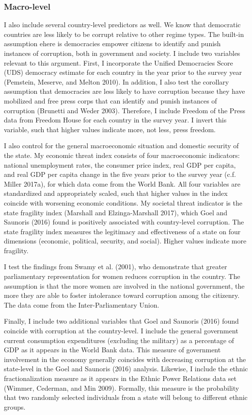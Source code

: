 \documentclass[11pt,]{article}
\begin{document}
\subsubsection{Macro-level}\label{macro-level}

I also include several country-level predictors as well. We know that
democratic countries are less likely to be corrupt relative to other
regime types. The built-in assumption ehere is democracies empower
citizens to identify and punish instances of corruption, both in
government and society. I include two variables relevant to this
argument. First, I incorporate the Unified Democracies Score (UDS)
democracy estimate for each country in the year prior to the survey year
(Pemstein, Meserve, and Melton 2010). In addition, I also test the
corollary assumption that democracies are less likely to have corruption
because they have mobilized and free press corps that can identify and
punish instances of corruption (Brunetti and Weder 2003). Therefore, I
include Freedom of the Press data from Freedom House for each country in
the survey year. I invert this variable, such that higher values
indicate more, not less, press freedom.

I also control for the general macroeconomic situation and domestic
security of the state. My economic threat index consists of four
macroeconomic indicators: national unemployment rates, the consumer
price index, real GDP per capita, and real GDP per capita change in the
five years prior to the survey year (c.f. Miller 2017a), for which data
come from the World Bank. All four variables are standardized and
appropriately scaled, such that higher values in the index coincide with
worsening economic conditions. My societal threat indicator is the state
fragility index (Marshall and Elzinga-Marshall 2017), which Goel and
Saunoris (2016) found is positively associated with country-level
corruption. The state fragility index measures the legitimacy and
effectiveness of a state on four dimensions (economic, political,
security, and social). Higher values indicate more fragility.

I test the findings from Swamy et al. (2001), who demonstrate that
greater parliamentary representation for women reduces corruption in the
country. The assumption is that the more women are involved in the
national government, the more they are able to foster intolerance toward
corruption among the citizenry. The data come from the
Inter-Parliamentary Union.

Finally, I include two additional variables that Goel and Saunoris
(2016) found coincide with corruption at the country-level. I include
the general government current consumption expenditures (excluding the
military) as a percentage of GDP as it appears in the World Bank data.
This measure of government involvement in the economy generally
coincides with decreasing corruption at the state-level in the Goel and
Saunoris (2016) analysis. Likewise, I include the ethnic
fractionalization measure as it appears in the Ethnic Power Relations
data set (Wimmer, Cederman, and Min 2009). Formally, this measure is the
probability that two randomly selected individuals from a state will
belong to different ethnic groups.
\end{document}
